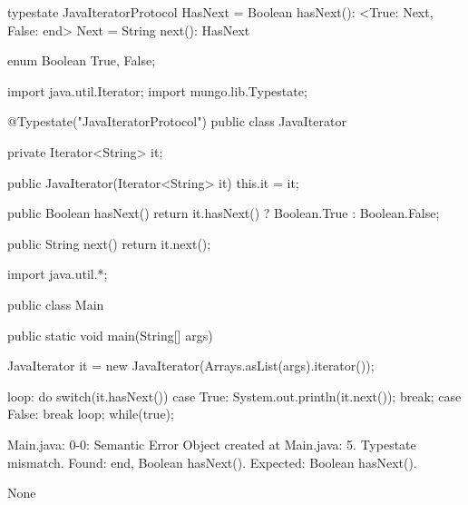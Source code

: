 \begin{code}
typestate JavaIteratorProtocol {
  HasNext = {
    Boolean hasNext(): <True: Next, False: end>
  }
  Next = {
    String next(): HasNext
  }
}\end{code}

\begin{code}
enum Boolean {
	True, False;
}\end{code}

\begin{code}
import java.util.Iterator;
import mungo.lib.Typestate;

@Typestate("JavaIteratorProtocol")
public class JavaIterator {

  private Iterator<String> it;

  public JavaIterator(Iterator<String> it) {
    this.it = it;
  }

	public Boolean hasNext() {
    return it.hasNext() ? Boolean.True : Boolean.False;
  }

  public String next() {
    return it.next();
  }

}\end{code}

\begin{code}
import java.util.*;

public class Main {
	public static void main(String[] args) {
		JavaIterator it = new JavaIterator(Arrays.asList(args).iterator());

    loop: do {
      switch(it.hasNext()) {
        case True:
          System.out.println(it.next());
          break;
        case False:
          break loop;
      }
    } while(true);
	}
}\end{code}

\lstset{caption=Original Mungo output}
\begin{code}

Main.java: 0-0: Semantic Error
		Object created at Main.java: 5. Typestate mismatch. Found: end, Boolean hasNext(). Expected: Boolean hasNext().
\end{code}

\lstset{caption=New Mungo output}
\begin{code}
None
\end{code}

